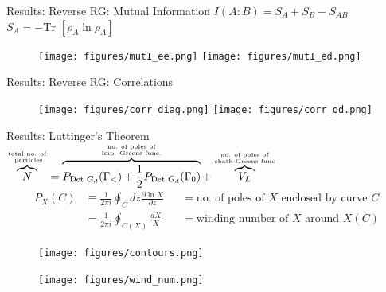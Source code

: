 \documentclass[aspectratio=169]{beamer}
\begin{document}
\begin{frame}{Results: Reverse RG: Mutual Information}
	\hspace*{\fill}	\(I(A:B) = S_A + S_B - S_{AB}\)\hspace*{\fill}\(S_A = -\text{Tr }\left[\rho_A \ln \rho_A\right]\)\hspace*{\fill}
	\begin{figure}[htpb]
		\centering
		\texttt{[image: figures/mutI\_ee.png]}\hspace*{\fill}
		\texttt{[image: figures/mutI\_ed.png]}
	\end{figure}
\end{frame}


\begin{frame}{Results: Reverse RG: Correlations}
	\begin{figure}[htpb]
		\centering
		\texttt{[image: figures/corr\_diag.png]}\hspace*{\fill}
		\texttt{[image: figures/corr\_od.png]}
	\end{figure}
\end{frame}

\begin{frame}{Results: Luttinger's Theorem}
	\hspace*{\fill}	{\Large \(\overbrace{N}^{\text{total no. of}\atop{\text{ particles}}} = \overbrace{P_{\text{Det }G_d}(\Gamma_<) + \frac{1}{2}P_{\text{Det }G_d}(\Gamma_0)}^{\text{no. of poles of}\atop{\text{imp. Greens func.}}} + \overbrace{V_L}^{\text{no. of poles of}\atop{\text{cbath Greens func}}}\)}\hspace*{\fill}
\begin{equation*}\begin{aligned}
	P_X(C) &\equiv \frac{1}{2\pi i}\oint_C dz \frac{\partial{\ln X}}{\partial{z}} &&=\text{no. of poles of } X \text{ enclosed by curve }C \\
	       &= \frac{1}{2\pi i}\oint_{C(X)} \frac{dX}{X} &&= \text{winding number of } X \text{ around }X(C)
\end{aligned}\end{equation*}
\begin{minipage}{0.4\textwidth}
	\begin{figure}[htpb]
		\centering
		\texttt{[image: figures/contours.png]}
	\end{figure}
\end{minipage}
\hspace*{0.15\textwidth}
\begin{minipage}{0.4\textwidth}
	\begin{figure}[htpb]
		\centering
		\texttt{[image: figures/wind\_num.png]}
	\end{figure}
\end{minipage}
\end{frame}
\end{document}
